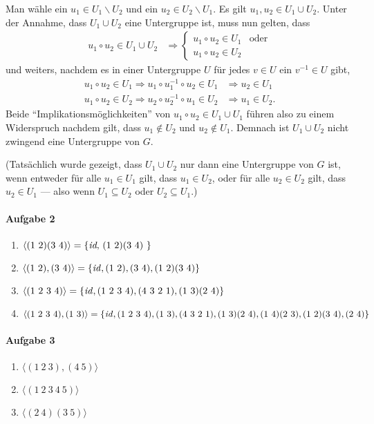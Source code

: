 \documentclass{article}
\begin{document}
\begin{enumerate}
    Man wähle ein $u_1 \in U_1 \backslash U_2$ und ein $u_2 \in U_2 \backslash U_1$. Es gilt $u_1, u_2 \in U_1 \cup U_2$. Unter der Annahme, dass $U_1 \cup U_2$ eine Untergruppe ist, muss nun gelten, dass
    \begin{align*}
        u_1 \circ u_2 \in U_1 \cup U_2 &\Rightarrow \begin{cases}
            u_1 \circ u_2 \in U_1 & \text{oder} \\
            u_1 \circ u_2 \in U_2
        \end{cases}
    \end{align*}
    und weiters, nachdem es in einer Untergruppe $U$ für jedes $v \in U$ ein $v^{-1} \in U$ gibt,
    \begin{align*}
        u_1 \circ u_2 \in U_1 \Rightarrow u_1 \circ u_1^{-1} \circ u_2 \in U_1 &\Rightarrow u_2 \in U_1 \\
        u_1 \circ u_2 \in U_2 \Rightarrow u_2 \circ u_2^{-1} \circ u_1 \in U_2 &\Rightarrow u_1 \in U_2.
    \end{align*}
    Beide \enquote{Implikationsmöglichkeiten} von $u_1 \circ u_2 \in U_1 \cup U_1$ führen also zu einem Widerspruch nachdem gilt, dass $u_1 \notin U_2$ und $u_2 \notin U_1$. Demnach ist $U_1 \cup U_2$ nicht zwingend eine Untergruppe von $G$.

    (Tatsächlich wurde gezeigt, dass $U_1 \cup U_2$ nur dann eine Untergruppe von $G$ ist, wenn entweder für alle $u_1 \in U_1$ gilt, dass $u_1 \in U_2$, oder für alle $u_2 \in U_2$ gilt, dass $u_2 \in U_1$ --- also wenn $U_1 \subseteq U_2$ oder $U_2 \subseteq U_1$.)
\end{enumerate}

\paragraph{Aufgabe 2}

\begin{enumerate}
    \item $\langle (1\ 2)(3\ 4) \rangle = \{ \text{\emph{id}, (1\ 2)(3\ 4) } \}$
    
    \item $\langle (1\ 2), (3\ 4) \rangle = \{ \text{\emph{id}}, (1\ 2), (3\ 4), (1\ 2)(3\ 4) \}$
    
    \item $\langle (1\ 2\ 3\ 4) \rangle = \{ \text{\emph{id}}, (1\ 2\ 3\ 4), (4\ 3\ 2\ 1), (1\ 3)(2\ 4) \}$
    
    \item $\langle (1\ 2\ 3\ 4), (1\ 3) \rangle = \{ \text{\emph{id}}, (1\ 2\ 3\ 4), (1\ 3), (4\ 3\ 2\ 1), (1\ 3)(2\ 4), (1\ 4)(2\ 3), (1\ 2)(3\ 4), (2\ 4) \}$
\end{enumerate}

\paragraph{Aufgabe 3}

\begin{enumerate}
    \item $\langle (1\ 2\ 3), (4\ 5) \rangle$
    \item $\langle (1\ 2\ 3\ 4\ 5) \rangle$
    \item $\langle (2\ 4)(3\ 5) \rangle$
\end{enumerate}
\end{document}

